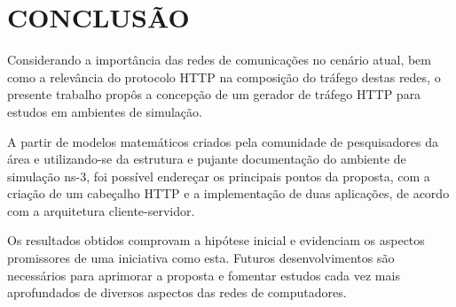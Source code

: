 \section{CONCLUSÃO}
Considerando a importância das redes de comunicações no cenário atual, bem como a relevância do protocolo HTTP na composição do tráfego destas redes, o presente trabalho propôs a concepção de um gerador de tráfego HTTP para estudos em ambientes de simulação.

A partir de modelos matemáticos criados pela comunidade de pesquisadores da área e utilizando-se da estrutura e pujante documentação do ambiente de simulação ns-3, foi possível endereçar os principais pontos da proposta, com a criação de um cabeçalho HTTP e a implementação de duas aplicações, de acordo com a arquitetura cliente-servidor.

Os resultados obtidos comprovam a hipótese inicial e evidenciam os aspectos promissores de uma iniciativa como esta. Futuros desenvolvimentos são necessários para aprimorar a proposta e fomentar estudos cada vez mais aprofundados de diversos aspectos das redes de computadores.
